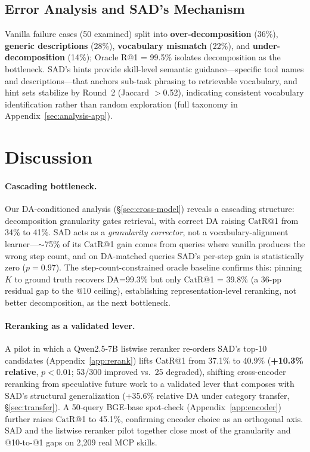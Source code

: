 \documentclass[11pt]{article}
\newcommand{\catrecall}{\text{CatR}}
\begin{document}
\subsection{Error Analysis and SAD's Mechanism}
\label{sec:analysis}

Vanilla failure cases (50 examined) split into \textbf{over-decomposition} (36\%), \textbf{generic descriptions} (28\%), \textbf{vocabulary mismatch} (22\%), and \textbf{under-decomposition} (14\%); Oracle R@1 = 99.5\% isolates decomposition as the bottleneck. SAD's hints provide skill-level semantic guidance---specific tool names and descriptions---that anchors sub-task phrasing to retrievable vocabulary, and hint sets stabilize by Round~2 (Jaccard $>$0.52), indicating consistent vocabulary identification rather than random exploration (full taxonomy in Appendix~\ref{sec:analysis-app}).

\section{Discussion}
\label{sec:discussion}
\vspace{-2pt}
\paragraph{Cascading bottleneck.}
Our DA-conditioned analysis (\S\ref{sec:cross-model}) reveals a cascading structure: decomposition granularity gates retrieval, with correct DA raising $\catrecall$@1 from 34\% to 41\%. SAD acts as a \emph{granularity corrector}, not a vocabulary-alignment learner---$\sim$75\% of its $\catrecall$@1 gain comes from queries where vanilla produces the wrong step count, and on DA-matched queries SAD's per-step gain is statistically zero ($p{=}0.97$). The step-count-constrained oracle baseline confirms this: pinning $K$ to ground truth recovers DA=99.3\% but only $\catrecall$@1 = 39.8\% (a 36-pp residual gap to the @10 ceiling), establishing representation-level reranking, not better decomposition, as the next bottleneck.
\paragraph{Reranking as a validated lever.}
A pilot in which a Qwen2.5-7B listwise reranker re-orders SAD's top-10 candidates (Appendix~\ref{app:rerank}) lifts $\catrecall$@1 from 37.1\% to 40.9\% (\textbf{+10.3\% relative}, $p{<}0.01$; 53/300 improved vs.\ 25 degraded), shifting cross-encoder reranking from speculative future work to a validated lever that composes with SAD's structural generalization (+35.6\% relative DA under category transfer, \S\ref{sec:transfer}). A 50-query BGE-base spot-check (Appendix~\ref{app:encoder}) further raises $\catrecall$@1 to 45.1\%, confirming encoder choice as an orthogonal axis. SAD and the listwise reranker pilot together close most of the granularity and @10-to-@1 gaps on 2{,}209 real MCP skills.
\end{document}
